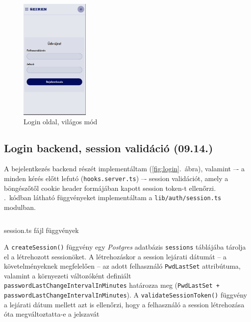 \documentclass[a4paper]{article}
\newcommand{\inlts}[1]{\texttt{#1}}
\newcommand{\inltxt}[1]{\texttt{#1}}
\begin{document}
\begin{figure}[ht]
  \centering
  \includegraphics[clip, trim=0 10 1 0, width = 0.3\textwidth]{images/login_page.png}
  \caption{Login oldal, világos mód}
  \label{fig:login_page}
\end{figure}

\subsection{Login backend, session validáció (09.14.)}

A bejelentkezés backend részét implementáltam (\ref{fig:login}.~ábra), valamint –- a minden
kérés előtt lefutó (\inlts{hooks.server.ts}) –- session validációt, amely a böngészőtől cookie
header formájában kapott session token-t ellenőrzi. \\

.~kódban látható függvényeket implementáltam a \inltxt{lib/auth/session.ts} modulban.

\begin{listing}[!ht]
\inputminted[bgcolor=codebg, breaklines, breakanywhere, fontsize=\small]{typescript}{code/session.ts}
\caption{session.ts fájl függvények}
\label{listing:session}
\end{listing}

A \inlts{createSession()} függvény egy \emph{Postgres} adatbázis \inltxt{sessions} táblájába tárolja el a
létrehozott sessionöket. A létrehozáskor a session lejárati dátumát – a követelményeknek
megfelelően – az adott felhasználó \inlts{PwdLastSet} attribútuma, valamint a környezeti változóként
definiált \inlts{passwordLastChangeIntervalInMinutes} határozza meg
(\inlts{PwdLastSet + passwordLastChangeIntervalInMinutes}). A \inlts{validateSessionToken()} függvény a lejárati dátum mellett
azt is ellenőrzi, hogy a felhasználó a session létrehozása óta megváltoztatta-e a
jelszavát
\end{document}
